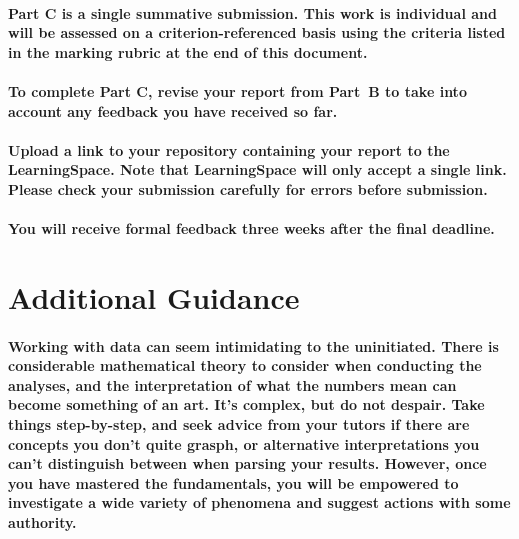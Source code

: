\documentclass{../../fal_assignment}
\begin{document}
\paragraph{
Part C is a \textbf{single summative submission}. This work is \textbf{individual} and will be assessed on a \textbf{criterion-referenced} basis using the criteria listed in the marking rubric at the end of this document.
}

\paragraph{
To complete Part C, revise your report from Part~B to take into account any feedback you have received so far.
}

\paragraph{
Upload a link to your repository containing your report to the LearningSpace. Note that LearningSpace will only accept a single link. Please check your submission carefully for errors before submission.
}

\paragraph{
You will receive \textbf{formal feedback} three weeks after the final deadline.
}

\section*{Additional Guidance}

\paragraph{
Working with data can seem intimidating to the uninitiated. There is considerable mathematical theory to 
consider when conducting the analyses, and the interpretation of what the numbers mean can become
something of an art. It's complex, but do not despair. Take things step-by-step, and seek advice from your
tutors if there are concepts you don't quite grasph, or alternative interpretations you can't distinguish between
when parsing your results. However, once you have mastered the fundamentals, you will be empowered to
investigate a wide variety of phenomena and suggest actions with some authority. 
}
\end{document}
